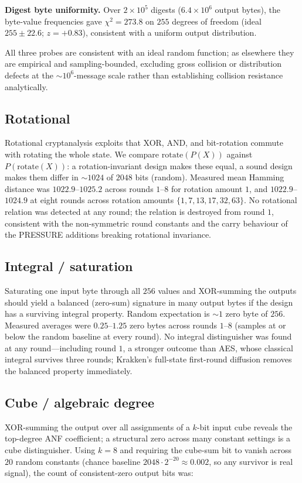 \documentclass[11pt]{article}
\begin{document}
\textbf{Digest byte uniformity.} Over $2\times10^{5}$ digests
($6.4\times10^{6}$ output bytes), the byte-value frequencies gave
$\chi^{2}=273.8$ on $255$ degrees of freedom (ideal $255\pm22.6$; $z=+0.83$),
consistent with a uniform output distribution.

All three probes are consistent with an ideal random function; as elsewhere they
are empirical and sampling-bounded, excluding gross collision or distribution
defects at the $\sim\!10^{6}$-message scale rather than establishing collision
resistance analytically.

\subsection{Rotational}
Rotational cryptanalysis exploits that XOR, AND, and bit-rotation commute with
rotating the whole state. We compare $\mathrm{rotate}(P(X))$ against
$P(\mathrm{rotate}(X))$: a rotation-invariant design makes these equal, a sound
design makes them differ in $\sim\!1024$ of $2048$ bits (random). Measured mean
Hamming distance was $1022.9$–$1025.2$ across rounds $1$–$8$ for rotation
amount $1$, and $1022.9$–$1024.9$ at eight rounds across rotation amounts
$\{1,7,13,17,32,63\}$. No rotational relation was detected at any round; the
relation is destroyed from round $1$, consistent with the non-symmetric round
constants and the carry behaviour of the PRESSURE additions breaking rotational
invariance.

\subsection{Integral / saturation}
Saturating one input byte through all $256$ values and XOR-summing the outputs
should yield a balanced (zero-sum) signature in many output bytes if the design
has a surviving integral property. Random expectation is $\sim\!1$ zero byte of
$256$. Measured averages were $0.25$–$1.25$ zero bytes across rounds $1$–$8$
(samples at or below the random baseline at every round). No integral
distinguisher was found at any round---including round $1$, a stronger outcome
than AES, whose classical integral survives three rounds; Krakken's full-state
first-round diffusion removes the balanced property immediately.

\subsection{Cube / algebraic degree}
XOR-summing the output over all assignments of a $k$-bit input cube reveals the
top-degree ANF coefficient; a structural zero across many constant settings is a
cube distinguisher. Using $k=8$ and requiring the cube-sum bit to vanish across
$20$ random constants (chance baseline $2048\cdot2^{-20}\approx0.002$, so any
survivor is real signal), the count of consistent-zero output bits was:
\end{document}
